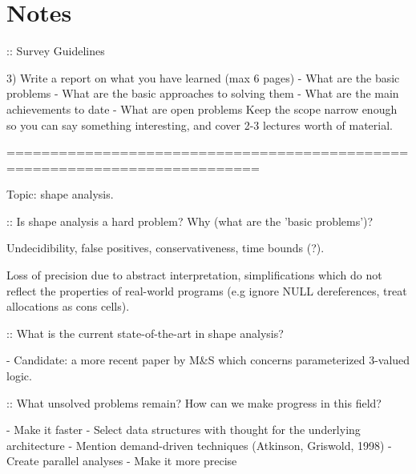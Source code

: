 \documentclass{article}
\begin{document}
\section*{Notes}

:: Survey Guidelines

3) Write a report on what you have learned (max 6 pages)
        - What are the basic problems
        - What are the basic approaches to solving them
        - What are the main achievements to date
        - What are open problems
Keep the scope narrow enough so you can say something interesting, and cover
2-3 lectures worth of material.

===========================================================================

Topic: shape analysis.

:: Is shape analysis a hard problem? Why (what are the 'basic problems')?

Undecidibility, false positives, conservativeness, time bounds (?).

Loss of precision due to abstract interpretation, simplifications which do not
reflect the properties of real-world programs (e.g ignore NULL dereferences,
treat allocations as cons cells).

:: What is the current state-of-the-art in shape analysis?

- Candidate: a more recent paper by M\&S which concerns parameterized 3-valued
  logic.

:: What unsolved problems remain? How can we make progress in this field?

- Make it faster
    - Select data structures with thought for the underlying architecture
    - Mention demand-driven techniques (Atkinson, Griswold, 1998)
    - Create parallel analyses
- Make it more precise
\end{document}

